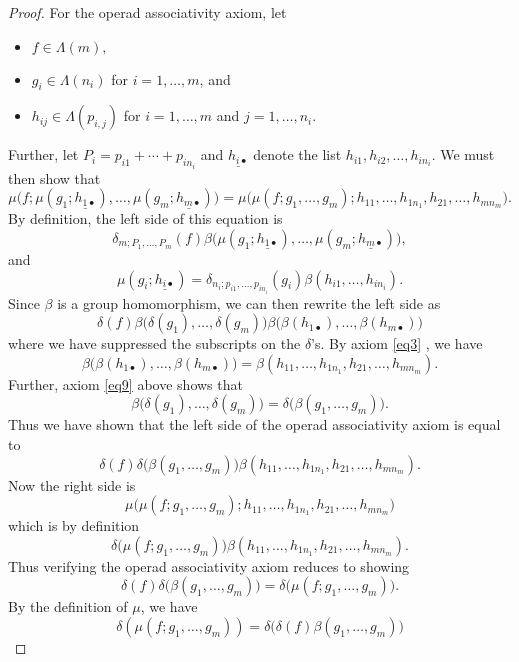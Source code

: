 \documentclass{amsbook} %
\newenvironment{eqn}{\begin{equation}}{\end{equation}}
\numberwithin{section}{chapter}
\begin{document}
\begin{proof}
For the operad associativity axiom, let
\begin{itemize}
\item $f \in \Lambda(m),$
\item $g_{i} \in \Lambda(n_{i})$ for $i=1, \ldots, m$, and
\item $h_{ij} \in \Lambda(p_{i,j})$ for $i=1, \ldots, m$ and $j=1, \ldots, n_{i}$.
\end{itemize}
Further, let $P_{i} = p_{i1} + \cdots + p_{in_{i}}$ and $\underline{h_{i\bullet}}$ denote the list $h_{i1}, h_{i2}, \ldots, h_{in_{i}}$.  We must then show that
\[
\mu\big( f; \mu(g_{1}; \underline{h_{1\bullet}}), \ldots, \mu(g_{m}; \underline{h_{m\bullet}}) \big) = \mu\big( \mu (f; g_{1}, \ldots, g_{m}); h_{11}, \ldots, h_{1n_{1}}, h_{21}, \ldots, h_{mn_{m}} \big).
\]
By definition, the left side of this equation is
\[
\delta_{m; P_{1}, \ldots, P_{m}}(f) \beta\big( \mu(g_{1}; \underline{h_{1\bullet}}), \ldots, \mu(g_{m}; \underline{h_{m\bullet}}) \big),
\]
and
\[
\mu(g_{i}; \underline{h_{i\bullet}}) = \delta_{n_{i}; p_{i1}, \ldots, p_{in_{i}}}(g_{i})\beta(h_{i1}, \ldots, h_{in_{i}}).
\]
Since $\beta$ is a group homomorphism, we can then rewrite the left side as
\[
\delta(f)\beta\big(\delta(g_{1}), \ldots, \delta(g_{m})\big)\beta\big(\beta(h_{1\bullet}), \ldots, \beta(h_{m\bullet})\big)
\]
where we have suppressed the subscripts on the $\delta$'s.  By axiom \eqref{eq3} , we have
\[
\beta\big(\beta(h_{1\bullet}), \ldots, \beta(h_{m\bullet})\big) = \beta(h_{11}, \ldots, h_{1n_{1}}, h_{21}, \ldots, h_{mn_{m}}).
\]
Further, axiom \eqref{eq9} above shows that
\[
\beta\big(\delta(g_{1}), \ldots, \delta(g_{m})\big) = \delta\big(\beta(g_{1}, \ldots, g_{m})\big).
\]
Thus we have shown that the left side of the operad associativity axiom is equal to
\[
\delta(f)\delta\big(\beta(g_{1}, \ldots, g_{m})\big)\beta(h_{11}, \ldots, h_{1n_{1}}, h_{21}, \ldots, h_{mn_{m}}).
\]
Now the right side is
\[
\mu\big( \mu (f; g_{1}, \ldots, g_{m}); h_{11}, \ldots, h_{1n_{1}}, h_{21}, \ldots, h_{mn_{m}} \big)
\]
which is by definition
\[
\delta\big(\mu (f; g_{1}, \ldots, g_{m})\big)\beta(h_{11}, \ldots, h_{1n_{1}}, h_{21}, \ldots, h_{mn_{m}} ).
\]
Thus verifying the operad associativity axiom reduces to showing
\begin{eqn}\label{eqn:opass}
\delta(f)\delta\big(\beta(g_{1}, \ldots, g_{m})\big) = \delta\big(\mu (f; g_{1}, \ldots, g_{m})\big).
\end{eqn}By the definition of $\mu$, we have
\[
\delta(\mu (f; g_{1}, \ldots, g_{m})) = \delta\big(\delta(f)\beta(g_{1}, \ldots, g_{m}) \big)
\]
\end{proof}
\end{document}
